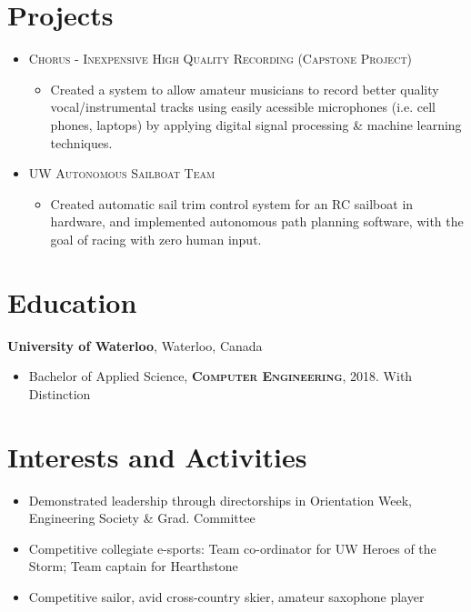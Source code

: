 \documentclass[a4paper,10pt]{article}
\begin{document}
\section{Projects}
\begin{itemize}
	\item {\textsc{Chorus - Inexpensive High Quality Recording (Capstone Project)}}
	\begin{itemize}
		\item {\footnotesize{Created a system to allow amateur musicians to record better quality vocal/instrumental tracks using easily acessible microphones (i.e. cell phones, laptops) by applying digital signal processing \& machine learning techniques.}}
	\end{itemize}

	\item {\textsc{UW Autonomous Sailboat Team}}
	\begin{itemize}
		\item {\footnotesize{Created automatic sail trim control system for an RC sailboat in hardware, and implemented autonomous path planning software, with the goal of racing with zero human input.}}
	\end{itemize}
\end{itemize}

\section{Education}
\textbf{University of Waterloo}, Waterloo, Canada
\begin{itemize}
    \item{\footnotesize{Bachelor of Applied Science, \textsc{\textbf{Computer Engineering}}, 2018. With Distinction}}
\end{itemize}

\section{Interests and Activities}
\begin{itemize}
	\item {\footnotesize{Demonstrated leadership through directorships in Orientation Week, Engineering Society \& Grad. Committee}}
	\item {\footnotesize{Competitive collegiate e-sports: Team co-ordinator for UW Heroes of the Storm; Team captain for Hearthstone}}
	\item {\footnotesize{Competitive sailor, avid cross-country skier, amateur saxophone player}}
\end{itemize}
\end{document}
